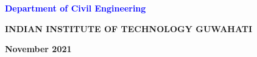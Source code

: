 \begin{titlepage}
\begin{center}
    {\large \textbf{\textcolor{blue}{Department of Civil Engineering}} \par}
    \vspace{0.5cm}
    {\large \textbf{INDIAN INSTITUTE OF TECHNOLOGY GUWAHATI}\par}
    \vspace{0.5cm}
    {\large \textbf{November 2021}}
\end{center}
\end{titlepage}